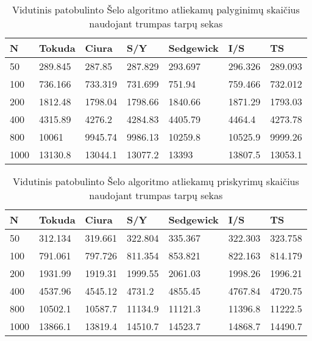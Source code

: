 \documentclass{VUMIFInfKursinis}
\begin{document}
\begin{table}[H]
  \caption{Vidutinis patobulinto Šelo algoritmo atliekamų palyginimų skaičius naudojant trumpas tarpų sekas}
  \begin{tabular}{|l|l|l|l|l|l|l|}
  \hline
  N    & Tokuda  & Ciura   & S/Y     & Sedgewick & I/S     & TS      \\ \hline
  50   & 289.845 & 287.85  & 287.829 & 293.697   & 296.326 & 289.093 \\ \hline
  100  & 736.166 & 733.319 & 731.699 & 751.94    & 759.466 & 732.012 \\ \hline
  200  & 1812.48 & 1798.04 & 1798.66 & 1840.66   & 1871.29 & 1793.03 \\ \hline
  400  & 4315.89 & 4276.2  & 4284.83 & 4405.79   & 4464.4  & 4273.78 \\ \hline
  800  & 10061   & 9945.74 & 9986.13 & 10259.8   & 10525.9 & 9999.26 \\ \hline
  1000 & 13130.8 & 13044.1 & 13077.2 & 13393     & 13807.5 & 13053.1 \\ \hline
  \end{tabular}
\end{table}

\begin{table}[H]
  \caption{Vidutinis patobulinto Šelo algoritmo atliekamų priskyrimų skaičius naudojant trumpas tarpų sekas}
  \begin{tabular}{|l|l|l|l|l|l|l|}
  \hline
  N    & Tokuda  & Ciura   & S/Y     & Sedgewick & I/S     & TS      \\ \hline
  50   & 312.134 & 319.661 & 322.804 & 335.367   & 322.303 & 323.758 \\ \hline
  100  & 791.061 & 797.726 & 811.354 & 853.821   & 822.163 & 814.179 \\ \hline
  200  & 1931.99 & 1919.31 & 1999.55 & 2061.03   & 1998.26 & 1996.21 \\ \hline
  400  & 4537.96 & 4545.12 & 4731.2  & 4855.45   & 4767.84 & 4720.75 \\ \hline
  800  & 10502.1 & 10587.7 & 11134.9 & 11121.3   & 11396.8 & 11222.5 \\ \hline
  1000 & 13866.1 & 13819.4 & 14510.7 & 14523.7   & 14868.7 & 14490.7 \\ \hline
  \end{tabular}
\end{table}
\end{document}
